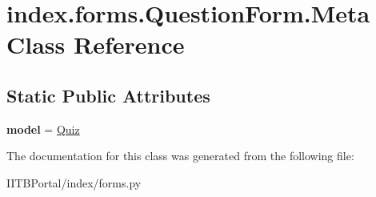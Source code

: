\hypertarget{classindex_1_1forms_1_1QuestionForm_1_1Meta}{}\section{index.\+forms.\+Question\+Form.\+Meta Class Reference}
\label{classindex_1_1forms_1_1QuestionForm_1_1Meta}
\subsection*{Static Public Attributes}
\begin{DoxyCompactItemize}
\item 
\mbox{\label{classindex_1_1forms_1_1QuestionForm_1_1Meta_a08e63d3d3561ccc0a4964be4c2935ec1}} 
{\bfseries model} = \hyperlink{classindex_1_1models_1_1Quiz}{Quiz}
\end{DoxyCompactItemize}


The documentation for this class was generated from the following file\+:\begin{DoxyCompactItemize}
\item 
I\+I\+T\+B\+Portal/index/forms.\+py\end{DoxyCompactItemize}
